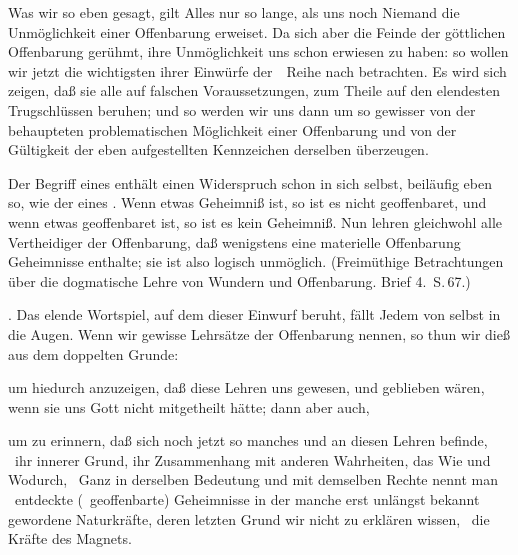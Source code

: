 Was wir so eben gesagt, gilt Alles nur so lange, als uns noch Niemand die Unmöglichkeit einer Offenbarung erweiset. Da sich aber die Feinde der göttlichen Offenbarung gerühmt, ihre Unmöglichkeit uns schon erwiesen zu haben: so wollen wir jetzt die wichtigsten ihrer Einwürfe der~\ Reihe nach betrachten. Es wird sich zeigen, daß sie alle auf falschen Voraussetzungen, zum Theile auf den elendesten Trugschlüssen beruhen; und so werden wir uns dann um so gewisser von der behaupteten problematischen Möglichkeit einer Offenbarung und von der Gültigkeit der eben aufgestellten Kennzeichen derselben überzeugen.\par
{} Der Begriff eines  enthält einen Widerspruch schon in sich selbst, beiläufig eben so, wie der eines . Wenn etwas Geheimniß ist, so ist es nicht geoffenbaret, und wenn etwas geoffenbaret ist, so ist es kein Geheimniß. Nun lehren gleichwohl alle Vertheidiger der Offenbarung, daß wenigstens eine materielle Offenbarung Geheimnisse enthalte; sie ist also logisch unmöglich. (Freimüthige Betrachtungen über die dogmatische Lehre von Wundern und Offenbarung. Brief 4.\ S.\,67.)\par
{}. Das elende Wortspiel, auf dem dieser Einwurf beruht, fällt Jedem von selbst in die Augen. Wenn wir gewisse Lehrsätze der Offenbarung  nennen, so thun wir dieß aus dem doppelten Grunde:
\begin{aufzb}
\item um hiedurch anzuzeigen, daß diese Lehren uns  gewesen, und  geblieben wären, wenn sie uns Gott nicht mitgetheilt hätte; dann aber auch,
\item um zu erinnern, daß sich noch jetzt so manches  und  an diesen Lehren befinde, \zB\ ihr innerer Grund, ihr Zusammenhang mit anderen Wahrheiten, das Wie und Wodurch, \usw\ Ganz in derselben Bedeutung und mit demselben Rechte nennt man \zB\ entdeckte (\dh\ geoffenbarte) Geheimnisse in der  manche erst unlängst bekannt gewordene Naturkräfte, deren letzten Grund wir nicht zu erklären wissen, \zB\ die Kräfte des Magnets.
\end{aufzb}

